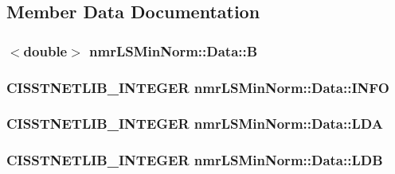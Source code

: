 \subsection{Member Data Documentation}
\hypertarget{classnmr_l_s_min_norm_1_1_data_a315f698926b4797c974dc79b7138802a}{
\subsubsection[{B}]{$<$double$>$ nmr\-L\-S\-Min\-Norm\-::\-Data\-::\-B}}\label{classnmr_l_s_min_norm_1_1_data_a315f698926b4797c974dc79b7138802a}
\hypertarget{classnmr_l_s_min_norm_1_1_data_a0f96a3e574e23758c6d7e362abad201e}{
\subsubsection[{I\-N\-F\-O}]{\setlength{\rightskip}{0pt plus 5cm}C\-I\-S\-S\-T\-N\-E\-T\-L\-I\-B\-\_\-\-I\-N\-T\-E\-G\-E\-R nmr\-L\-S\-Min\-Norm\-::\-Data\-::\-I\-N\-F\-O}}\label{classnmr_l_s_min_norm_1_1_data_a0f96a3e574e23758c6d7e362abad201e}
\hypertarget{classnmr_l_s_min_norm_1_1_data_aa226626d2953d325f1c2738a099d5aad}{
\subsubsection[{L\-D\-A}]{\setlength{\rightskip}{0pt plus 5cm}C\-I\-S\-S\-T\-N\-E\-T\-L\-I\-B\-\_\-\-I\-N\-T\-E\-G\-E\-R nmr\-L\-S\-Min\-Norm\-::\-Data\-::\-L\-D\-A}}\label{classnmr_l_s_min_norm_1_1_data_aa226626d2953d325f1c2738a099d5aad}
\hypertarget{classnmr_l_s_min_norm_1_1_data_a9489b20db60c5e3a26941e1810cfe895}{
\subsubsection[{L\-D\-B}]{\setlength{\rightskip}{0pt plus 5cm}C\-I\-S\-S\-T\-N\-E\-T\-L\-I\-B\-\_\-\-I\-N\-T\-E\-G\-E\-R nmr\-L\-S\-Min\-Norm\-::\-Data\-::\-L\-D\-B}}\label{classnmr_l_s_min_norm_1_1_data_a9489b20db60c5e3a26941e1810cfe895}
